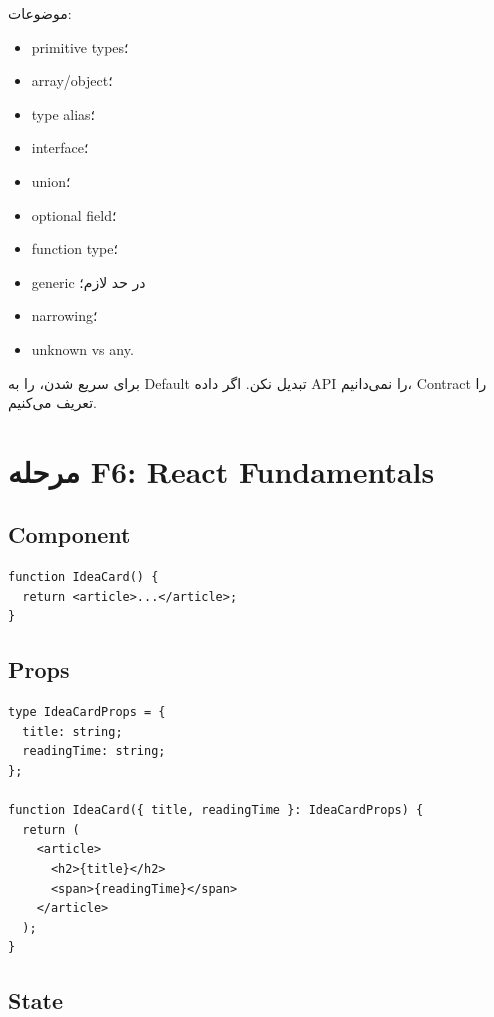 موضوعات:
\begin{itemize}
  \item primitive types؛
  \item array/object؛
  \item type alias؛
  \item interface؛
  \item union؛
  \item optional field؛
  \item function type؛
  \item generic در حد لازم؛
  \item narrowing؛
  \item unknown vs any.
\end{itemize}

\begin{warningbox}
برای سریع شدن،  را به Default تبدیل نکن. اگر داده API را نمی‌دانیم، Contract را تعریف می‌کنیم.
\end{warningbox}

\section{مرحله F6: React Fundamentals}

\subsection{Component}

\begin{latin}
\begin{lstlisting}
function IdeaCard() {
  return <article>...</article>;
}
\end{lstlisting}
\end{latin}

\subsection{Props}

\begin{latin}
\begin{lstlisting}
type IdeaCardProps = {
  title: string;
  readingTime: string;
};

function IdeaCard({ title, readingTime }: IdeaCardProps) {
  return (
    <article>
      <h2>{title}</h2>
      <span>{readingTime}</span>
    </article>
  );
}
\end{lstlisting}
\end{latin}

\subsection{State}

